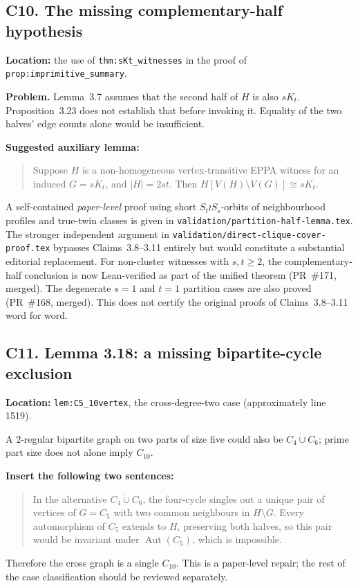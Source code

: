 \documentclass[11pt,a4paper]{article}
\begin{document}
\subsection*{C10. The missing complementary-half hypothesis}
\textbf{Location:} the use of
\texttt{thm:sKt\_witnesses} in the proof of
\texttt{prop:imprimitive\_summary}.

\textbf{Problem.} Lemma~3.7 assumes that the
second half of \(H\) is also \(sK_t\).
Proposition~3.23 does not establish that before
invoking it. Equality of the two halves'
edge counts alone would be insufficient.

\textbf{Suggested auxiliary lemma:}
\begin{quote}
Suppose \(H\) is a non-homogeneous
vertex-transitive EPPA witness for an
induced \(G=sK_t\), and \(|H|=2st\).
Then \(H[V(H)\setminus V(G)]\cong sK_t\).
\end{quote}
A self-contained \emph{paper-level} proof using
short \(S_t\wr S_s\)-orbits of neighbourhood profiles
and true-twin classes is given in
\texttt{validation/partition-half-lemma.tex}.
The stronger independent argument in
\texttt{validation/direct-clique-cover-proof.tex}
bypasses Claims~3.8--3.11 entirely but would
constitute a substantial editorial replacement.
For non-cluster witnesses with \(s,t\ge2\), the complementary-half
conclusion is now Lean-verified as part of the unified theorem
(PR~\#171, merged). The degenerate \(s=1\) and \(t=1\) partition
cases are also proved (PR~\#168, merged). This does not certify the
original proofs of Claims~3.8--3.11 word for word.

\subsection*{C11. Lemma 3.18: a missing bipartite-cycle exclusion}
\textbf{Location:} \texttt{lem:C5\_10vertex},
the cross-degree-two case (approximately line 1519).

A \(2\)-regular bipartite graph on two parts of size five
could also be \(C_4\dot\cup C_6\);
prime part size does not alone imply \(C_{10}\).

\textbf{Insert the following two sentences:}
\begin{quote}
In the alternative \(C_4\dot\cup C_6\),
the four-cycle singles out a unique pair of
vertices of \(G=C_5\) with two common neighbours
in \(H\setminus G\). Every automorphism of
\(C_5\) extends to \(H\), preserving both halves,
so this pair would be invariant under
\(\operatorname{Aut}(C_5)\), which is impossible.
\end{quote}
Therefore the cross graph is a single \(C_{10}\).
This is a paper-level repair; the rest of the
case classification should be reviewed separately.
\end{document}
